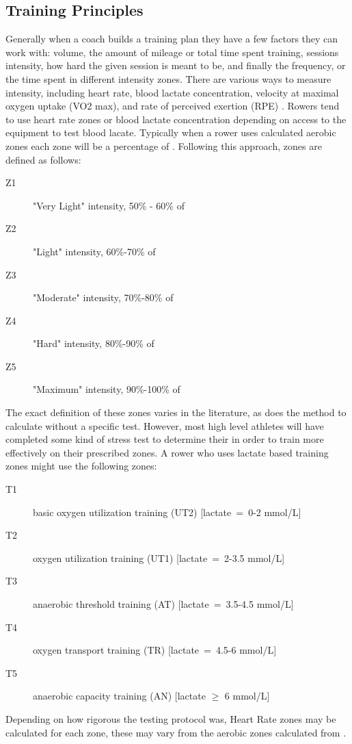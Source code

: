 \subsection{Training Principles} \label{sub:training_principles}
Generally when a coach builds a training plan they have a few factors they can work with: volume, the amount of mileage or total time spent training, sessions intensity, how hard the given session is meant to be, and finally the frequency, or the time spent in different intensity zones. There are various ways to measure intensity, including heart rate, blood lactate concentration, velocity at maximal oxygen uptake (VO2 max), and rate of perceived exertion (RPE) \autocite{Rosenblat2019}. Rowers tend to use heart rate zones or blood lactate concentration depending on access to the equipment to test blood lacate. Typically when a rower uses calculated aerobic zones each zone will be a percentage of \maxHR. Following this approach, zones are defined as follows:
\begin{description}
  \item[Z1] "Very Light" intensity, 50\% - 60\% of \maxHR
  \item[Z2] "Light" intensity, 60\%-70\% of \maxHR
  \item[Z3] "Moderate" intensity, 70\%-80\% of \maxHR
  \item[Z4] "Hard" intensity, 80\%-90\% of \maxHR
  \item[Z5] "Maximum" intensity, 90\%-100\% of \maxHR
\end{description}
The exact definition of these zones varies in the literature, as does the method to calculate \maxHR without a specific test. However, most high level athletes will have completed some kind of stress test to determine their \maxHR in order to train more effectively on their prescribed zones.
A rower who uses lactate based training zones might use the following zones:
\begin{description}
  \item[T1]  basic oxygen utilization training (UT2) [lactate~=~0-2 mmol/L]
  \item[T2]  oxygen utilization training (UT1) [lactate~=~2-3.5 mmol/L]
  \item[T3]  anaerobic threshold training (AT) [lactate~=~3.5-4.5 mmol/L]
  \item[T4]  oxygen transport training (TR) [lactate~=~4.5-6 mmol/L]
  \item[T5]  anaerobic capacity training (AN) [lactate $\geq$ 6 mmol/L] \autocite{Das2022}
\end{description}
Depending on how rigorous the testing protocol was, Heart Rate zones may be calculated for each zone, these may vary from the aerobic zones calculated from \maxHR.

